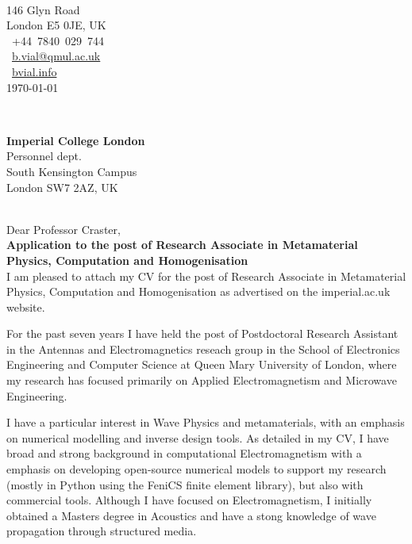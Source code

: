 \documentclass{cv}
\begin{document}
\hfill%
\begin{minipage}[t]{.5\textwidth}
\\
146 Glyn Road\\
London E5 0JE, UK\\
~+44~7840~029~744\\
~\href{mailto:b.vial@qmul.ac.uk}{b.vial@qmul.ac.uk}\\
~\href{www.bvial.info}{bvial.info}
\\[2em]
\today
\end{minipage}\\[1em]
\begin{minipage}[t]{.5\textwidth}
    \begin{flushleft}
        \textbf{Imperial College London}\\
Personnel dept.\\
South Kensington Campus\\
London SW7 2AZ, UK\\
    \end{flushleft}
\end{minipage}
\hfill %
\\[2em]


Dear Professor Craster,\\[1em]


\textbf{Application to the post of Research Associate in Metamaterial Physics, Computation and Homogenisation}\\[1.em]


I am pleased to attach my CV for the post of
Research Associate in Metamaterial Physics, Computation and Homogenisation 
as advertised on the imperial.ac.uk website.

For the past seven years I have held the post of Postdoctoral Research
Assistant in the Antennas and Electromagnetics reseach group in
the School of Electronics Engineering and Computer Science
at Queen Mary University of London, where my research
has focused primarily on Applied Electromagnetism and Microwave Engineering.

I have a particular interest in Wave Physics and metamaterials, with an emphasis on numerical
modelling and inverse design tools. As detailed in my CV, I have 
broad and strong background in computational Electromagnetism 
with a emphasis on developing open-source numerical models 
to support my research (mostly in Python using the FeniCS finite element library), 
but also with commercial tools. Although I have focused on Electromagnetism, 
I initially obtained a Masters degree in Acoustics and have a stong 
knowledge of wave propagation through structured media. 
\end{document}
